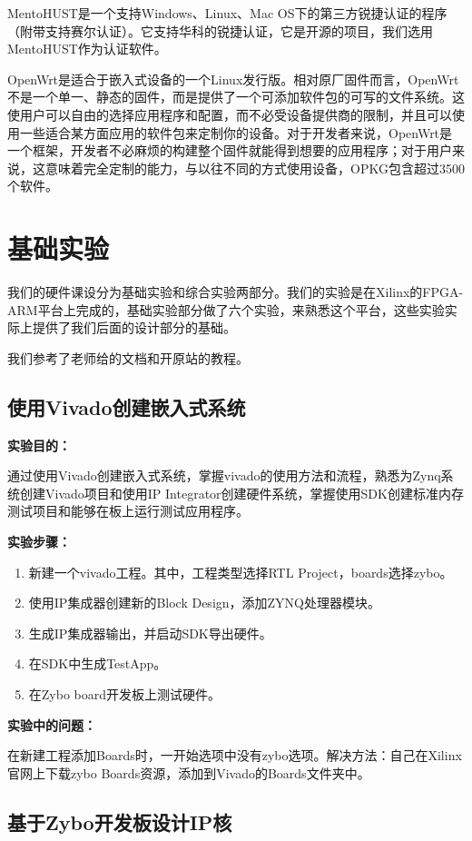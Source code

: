 \documentclass{itecreport-zh}
\begin{document}
MentoHUST是一个支持Windows、Linux、Mac OS下的第三方锐捷认证的程序（附带支持赛尔认证）。它支持华科的锐捷认证，它是开源的项目，我们选用MentoHUST作为认证软件。


OpenWrt是适合于嵌入式设备的一个Linux发行版。相对原厂固件而言，OpenWrt不是一个单一、静态的固件，而是提供了一个可添加软件包的可写的文件系统。这使用户可以自由的选择应用程序和配置，而不必受设备提供商的限制，并且可以使用一些适合某方面应用的软件包来定制你的设备。对于开发者来说，OpenWrt是一个框架，开发者不必麻烦的构建整个固件就能得到想要的应用程序；对于用户来说，这意味着完全定制的能力，与以往不同的方式使用设备，OPKG包含超过3500个软件。

\chapter{基础实验}

我们的硬件课设分为基础实验和综合实验两部分。我们的实验是在Xilinx的FPGA-ARM平台上完成的，基础实验部分做了六个实验，来熟悉这个平台，这些实验实际上提供了我们后面的设计部分的基础。


我们参考了老师给的文档和开原站的教程。
\section{使用Vivado创建嵌入式系统}
\textbf{实验目的：}


通过使用Vivado创建嵌入式系统，掌握vivado的使用方法和流程，熟悉为Zynq系统创建Vivado项目和使用IP Integrator创建硬件系统，掌握使用SDK创建标准内存测试项目和能够在板上运行测试应用程序。


\textbf{实验步骤：}

\begin{enumerate}
  \item 新建一个vivado工程。其中，工程类型选择RTL Project，boards选择zybo。
  \item 使用IP集成器创建新的Block Design，添加ZYNQ处理器模块。
  \item 生成IP集成器输出，并启动SDK导出硬件。
  \item 在SDK中生成TestApp。
  \item 在Zybo board开发板上测试硬件。
\end{enumerate}
\textbf{实验中的问题：}


在新建工程添加Boards时，一开始选项中没有zybo选项。解决方法：自己在Xilinx官网上下载zybo Boards资源，添加到Vivado的Boards文件夹中。

\section{基于Zybo开发板设计IP核}
\end{document}
